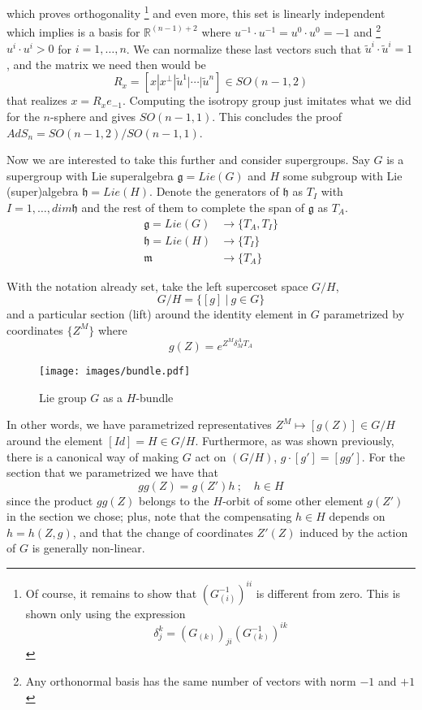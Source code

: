 \documentclass[a4paper,12pt]{article}
\numberwithin{equation}{section}
\numberwithin{thm}{section}
\numberwithin{exm}{section}
\newcommand{\wt}{\widetilde}
\newcommand{\lra}{\longrightarrow}
\newcommand{\R}{{\mathbb R}}
\newcommand{\<}{{\langle}}
\renewcommand{\>}{{\rangle}}
\newcommand{\mf}{\mathfrak}
\renewcommand{\d}{{\delta}}
\begin{document}
which proves orthogonality%
\footnote{Of course, it remains to show that $(G^{-1}_{(i)})^{ii}$ is different from zero. This is shown only using the expression $$ \d^k_j = (G_{(k)})_{ji}(G^{-1}_{(k)})^{ik} $$}
and even more, this set is linearly independent which implies is a basis for $\R^{(n-1) + 2}$ where $u^{-1}\cdot u^{-1} = u^0\cdot u^0 = -1$ and%
\footnote{Any orthonormal basis has the same number of vectors with norm $-1$ and $+1$}
$u^i\cdot u^i > 0$ for $i=1,\ldots,n$. We can normalize these last vectors such that $\wt u^i\cdot \wt u^i = 1$, and the matrix we need then would be
	\begin{equation}
	R_x = \left[x | x^\perp | \wt u^1 | \cdots | \wt u^n \right] \in SO(n-1, 2)
	\end{equation}
that realizes $x = R_x e_{-1}$. Computing the isotropy group just imitates what we did for the $n$-sphere and gives $SO(n-1,1)$. This concludes the proof $AdS_n = SO(n-1,2)/SO(n-1,1)$.

Now we are interested to take this further and consider supergroups. Say $G$ is a supergroup with Lie superalgebra $\mf g = Lie(G)$ and $H$ some subgroup with Lie (super)algebra $\mf h = Lie(H)$. Denote the generators of $\mf h$ as $T_I$ with $I = 1,\ldots,dim{\mathfrak h}$ and the rest of them to complete the span of ${\mathfrak g}$ as $T_A$.
	\begin{align}
	\mf g = Lie(G) & \lra \{T_A, T_I\} \\
	\mf h = Lie(H) & \lra \{T_I\} \\
	\mf m & \lra \{T_A\}
	\end{align}

With the notation already set, take the left supercoset space $G/H$, 
	\begin{equation}
	G/H = \{[g]\ |\ g\in G\}
	\end{equation}
and a particular section (lift) around the identity element in $G$ parametrized by coordinates $\{Z^M\}$ where
	\begin{equation}
	g(Z) = e^{Z^M \d^A_M T_A}
	\end{equation}
	\begin{figure}[ht]
  	\centering
  	\texttt{[image: images/bundle.pdf]}
  	\caption{Lie group $G$ as a $H$-bundle}
  	\label{bundle}
	\end{figure}
In other words, we have parametrized representatives $Z^M \mapsto [g(Z)] \in G/H$ around the element $[Id] = H \in G/H$. Furthermore, as was shown previously, there is a canonical way of making $G$ act on $(G/H)$, $g\cdot [g'] = [g g']$. For the section that we parametrized we have that
	\begin{equation}\label{left}
	g g(Z) = g(Z') h\ ;\quad h\in H
	\end{equation}
since the product $g g(Z)$ belongs to the $H$-orbit of some other element $g(Z')$ in the section we chose; plus, note that the compensating $h\in H$ depends on $h = h(Z, g)$, and that the change of coordinates $Z'(Z)$ induced by the action of $G$ is generally non-linear.
\end{document}
